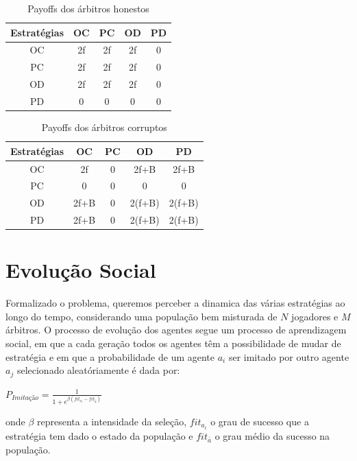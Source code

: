 \documentclass[conference, twocolumn]{IEEEtran}
\theoremstyle{plain}
\theoremstyle{definition}
\theoremstyle{remark}
\begin{document}
    \begin{table}[h]
        \centering
        \begin{tabular}{c|cccc}
            Estratégias&OC&PC&OD&PD\\
            \hline
            OC & 2f & 2f & 2f & 0\\
            PC & 2f & 2f & 2f & 0\\
            OD & 2f & 2f & 2f & 0\\
            PD & 0 & 0 & 0 & 0\\
        \end{tabular}
        \caption{Payoffs dos árbitros honestos}
    \end{table}

    \begin{table}[h]
        \centering
        \begin{tabular}{c|cccc}
            Estratégias&OC&PC&OD&PD\\
            \hline
            OC & 2f & 0 & 2f+B & 2f+B\\
            PC & 0 & 0 & 0 & 0\\
            OD & 2f+B & 0 & 2(f+B) & 2(f+B)\\
            PD & 2f+B & 0 & 2(f+B) & 2(f+B)\\
        \end{tabular}
        \caption{Payoffs dos árbitros corruptos}
    \end{table}


    \section{Evolução Social}
    Formalizado o problema, queremos perceber a dinamica das várias estratégias ao longo do tempo, considerando uma população bem misturada de $N$ jogadores e $M$ árbitros.
    O processo de evolução dos agentes segue um processo de aprendizagem social, em que a cada geração todos os agentes têm a possibilidade de mudar de estratégia e em que a probabilidade de um agente $a_{i}$ ser imitado por outro agente $a_{j}$ selecionado aleatóriamente é dada por:

    \begin{center}
        $P_{Imitação} = \frac{1}{1+e^{\beta(fit_{a_i}-fit_{\bar{a}})}}$
    \end{center}
    onde $\beta$ representa a intensidade da seleção, $fit_{a_{i}}$ o grau de sucesso que a estratégia tem dado o estado da população e $fit_{\bar{a}}$ o grau médio da sucesso na população.
\end{document}
